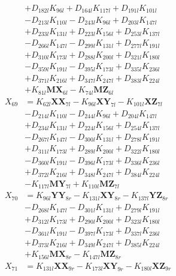 \begin{multicols}{2}
\begin{align}
&+ D_{182l}K_{96l} + D_{164l}K_{117l} + D_{191l}K_{101l}  \nonumber \\
&- D_{213l}K_{110l} - D_{243l}K_{96l} + D_{203l}K_{147l}  \nonumber \\
&+ D_{233l}K_{131l} + D_{223l}K_{156l} + D_{253l}K_{137l}  \nonumber \\
&- D_{266l}K_{147l} - D_{299l}K_{131l} + D_{277l}K_{191l}  \nonumber \\
&+ D_{310l}K_{173l} + D_{288l}K_{200l} + D_{321l}K_{180l}  \nonumber \\
&- D_{359l}K_{191l} - D_{395l}K_{173l} + D_{335l}K_{236l}  \nonumber \\
&+ D_{371l}K_{216l} + D_{347l}K_{247l} + D_{383l}K_{224l}  \nonumber \\
&+ K_{81l}\mathbf{MX}_{6l} - K_{74l}\mathbf{MZ}_{6l} \nonumber \\
X_{69} &= K_{62l}\mathbf{XX}_{7l} - K_{96l}\mathbf{XY}_{7l} - K_{101l}\mathbf{XZ}_{7l}  \nonumber \\
&- D_{214l}K_{110l} - D_{244l}K_{96l} + D_{204l}K_{147l}  \nonumber \\
&+ D_{234l}K_{131l} + D_{224l}K_{156l} + D_{254l}K_{137l}  \nonumber \\
&- D_{267l}K_{147l} - D_{300l}K_{131l} + D_{278l}K_{191l}  \nonumber \\
&+ D_{311l}K_{173l} + D_{289l}K_{200l} + D_{322l}K_{180l}  \nonumber \\
&- D_{360l}K_{191l} - D_{396l}K_{173l} + D_{336l}K_{236l}  \nonumber \\
&+ D_{372l}K_{216l} + D_{348l}K_{247l} + D_{384l}K_{224l}  \nonumber \\
&- K_{117l}\mathbf{MY}_{7l} + K_{110l}\mathbf{MZ}_{7l} \nonumber \\
X_{70} &= K_{96l}\mathbf{YY}_{8r} - K_{131l}\mathbf{XY}_{8r} - K_{137l}\mathbf{YZ}_{8r}  \nonumber \\
&- D_{268l}K_{147l} - D_{301l}K_{131l} + D_{279l}K_{191l}  \nonumber \\
&+ D_{312l}K_{173l} + D_{290l}K_{200l} + D_{323l}K_{180l}  \nonumber \\
&- D_{361l}K_{191l} - D_{397l}K_{173l} + D_{337l}K_{236l}  \nonumber \\
&+ D_{373l}K_{216l} + D_{349l}K_{247l} + D_{385l}K_{224l}  \nonumber \\
&+ K_{156l}\mathbf{MX}_{8r} - K_{147l}\mathbf{MZ}_{8r} \nonumber \\
X_{71} &= K_{131l}\mathbf{XX}_{9r} - K_{173l}\mathbf{XY}_{9r} - K_{180l}\mathbf{XZ}_{9r}  \nonumber \\

\end{align}
\end{multicols}

